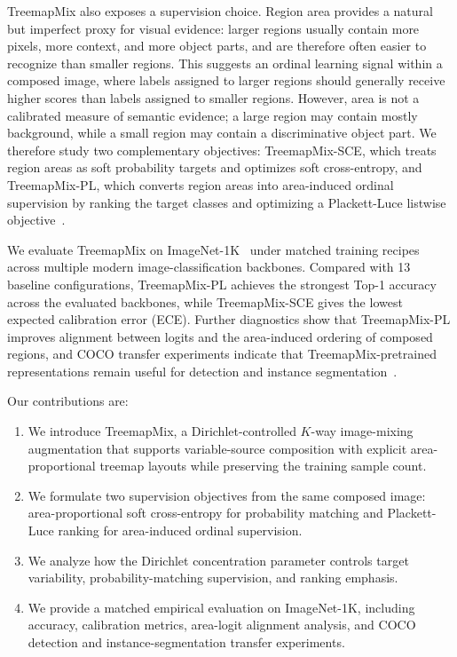 TreemapMix also exposes a supervision choice. Region area provides a natural
but imperfect proxy for visual evidence: larger regions usually contain more
pixels, more context, and more object parts, and are therefore often easier to
recognize than smaller regions. This suggests an ordinal learning signal within
a composed image, where labels assigned to larger regions should generally
receive higher scores than labels assigned to smaller regions. However, area is
not a calibrated measure of semantic evidence; a large region may contain mostly
background, while a small region may contain a discriminative object part. We
therefore study two complementary objectives: TreemapMix-SCE, which treats
region areas as soft probability targets and optimizes soft cross-entropy, and
TreemapMix-PL, which converts region areas into area-induced ordinal
supervision by ranking the target classes and optimizing a Plackett-Luce
listwise objective~\citep{luce1959,plackett1975,listmle}.

We evaluate TreemapMix on ImageNet-1K~\citep{
dengImageNetLargescaleHierarchical2009} under matched training recipes across
multiple modern image-classification backbones. Compared with 13 baseline configurations, TreemapMix-PL achieves
the strongest Top-1 accuracy across the evaluated backbones, while
TreemapMix-SCE gives the lowest expected calibration error (ECE). Further
diagnostics show that TreemapMix-PL improves alignment between logits and the
area-induced ordering of composed regions, and COCO transfer experiments
indicate that TreemapMix-pretrained representations remain useful for detection
and instance segmentation~\citep{linMicrosoftCOCOCommon2015}.

Our contributions are:
\begin{enumerate}
    \renewcommand{\labelenumi}{\roman{enumi}.}
    \item We introduce TreemapMix, a Dirichlet-controlled $K$-way image-mixing
    augmentation that supports variable-source composition with explicit
    area-proportional treemap layouts while preserving the training sample
    count.

    \item We formulate two supervision objectives from the same composed image:
    area-proportional soft cross-entropy for probability matching and
    Plackett-Luce ranking for area-induced ordinal supervision.

    \item We analyze how the Dirichlet concentration parameter controls target
    variability, probability-matching supervision, and ranking emphasis.

    \item We provide a matched empirical evaluation on ImageNet-1K, including
    accuracy, calibration metrics, area-logit alignment analysis, and COCO
    detection and instance-segmentation transfer experiments.
\end{enumerate}
